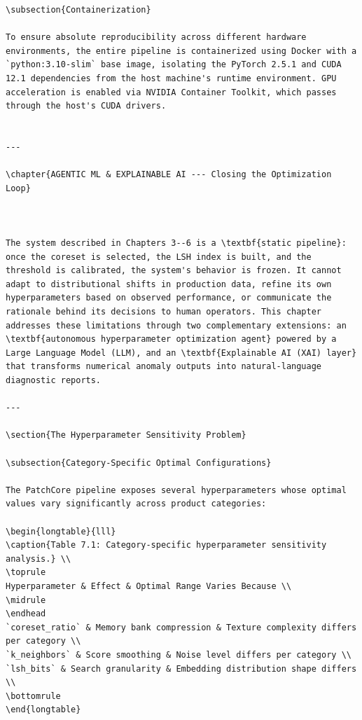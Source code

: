 \documentclass[12pt,a4paper,oneside]{report}
\begin{document}
\begin{verbatim}
\subsection{Containerization}

To ensure absolute reproducibility across different hardware environments, the entire pipeline is containerized using Docker with a `python:3.10-slim` base image, isolating the PyTorch 2.5.1 and CUDA 12.1 dependencies from the host machine's runtime environment. GPU acceleration is enabled via NVIDIA Container Toolkit, which passes through the host's CUDA drivers.


---

\chapter{AGENTIC ML & EXPLAINABLE AI --- Closing the Optimization Loop}



The system described in Chapters 3--6 is a \textbf{static pipeline}: once the coreset is selected, the LSH index is built, and the threshold is calibrated, the system's behavior is frozen. It cannot adapt to distributional shifts in production data, refine its own hyperparameters based on observed performance, or communicate the rationale behind its decisions to human operators. This chapter addresses these limitations through two complementary extensions: an \textbf{autonomous hyperparameter optimization agent} powered by a Large Language Model (LLM), and an \textbf{Explainable AI (XAI) layer} that transforms numerical anomaly outputs into natural-language diagnostic reports.

---

\section{The Hyperparameter Sensitivity Problem}

\subsection{Category-Specific Optimal Configurations}

The PatchCore pipeline exposes several hyperparameters whose optimal values vary significantly across product categories:

\begin{longtable}{lll}
\caption{Table 7.1: Category-specific hyperparameter sensitivity analysis.} \\
\toprule
Hyperparameter & Effect & Optimal Range Varies Because \\
\midrule
\endhead
`coreset_ratio` & Memory bank compression & Texture complexity differs per category \\
`k_neighbors` & Score smoothing & Noise level differs per category \\
`lsh_bits` & Search granularity & Embedding distribution shape differs \\
\bottomrule
\end{longtable}




\end{verbatim}
\end{document}

